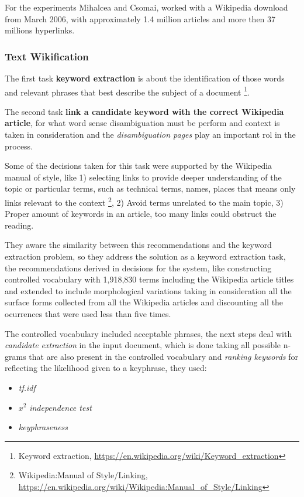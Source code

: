 For the experiments Mihalcea and Csomai, worked with a Wikipedia download from March 2006, with approximately 1.4 million articles and more
then 37 millions hyperlinks.

\subsubsection{Text Wikification}
The first task \textbf{keyword extraction} is about the identification of those words and relevant phrases 
that best describe the subject of a document \footnote{Keyword extraction, \url{https://en.wikipedia.org/wiki/Keyword_extraction}}.


The second task \textbf{link a candidate keyword with the correct Wikipedia article}, for what word sense disambiguation
must be perform and context is taken in consideration and the {\em disambiguation pages} play an important rol in the process.

Some of the decisions taken for this task were supported by the Wikipedia manual of style, like 1) selecting links to provide deeper
understanding of the topic or particular terms, such as technical terms, names, places that means only links relevant to the context
\footnote{Wikipedia:Manual of Style/Linking, \url{https://en.wikipedia.org/wiki/Wikipedia:Manual_of_Style/Linking}},
2) Avoid terms unrelated to the main topic, 3) Proper amount of keywords in an article, too many links could obstruct the reading.

They aware the similarity  between this recommendations and the keyword extraction problem, so they address the solution as
a keyword extraction task, the recommendations derived in decisions for the system, like constructing controlled vocabulary with
1,918,830 terms including the Wikipedia article titles and extended to include morphological variations taking in consideration
all the surface forms collected from all the Wikipedia articles and discounting all the ocurrences that were used less than
five times.

The controlled vocabulary included acceptable phrases, the next steps deal with {\em candidate extraction} in the input document, 
which is done taking all possible n-grams that are also present in the controlled vocabulary and {\em ranking keywords} 
for reflecting the likelihood given to a keyphrase, they used:

\begin{itemize}
 \item {\em tf.idf}
 \item $x^2$ {\em independence test}       
 \item {\em keyphraseness}
\end{itemize}



